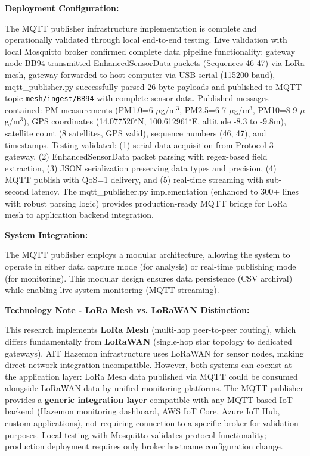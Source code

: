 \textbf{Deployment Configuration:}

The MQTT publisher infrastructure implementation is complete and operationally validated through local end-to-end testing. Live validation with local Mosquitto broker confirmed complete data pipeline functionality: gateway node BB94 transmitted EnhancedSensorData packets (Sequences 46-47) via LoRa mesh, gateway forwarded to host computer via USB serial (115200 baud), mqtt\_publisher.py successfully parsed 26-byte payloads and published to MQTT topic \texttt{mesh/ingest/BB94} with complete sensor data. Published messages contained: PM measurements (PM1.0=6 $\mu$g/m$^3$, PM2.5=6-7 $\mu$g/m$^3$, PM10=8-9 $\mu$g/m$^3$), GPS coordinates (14.077520$^\circ$N, 100.612961$^\circ$E, altitude -8.3 to -9.8m), satellite count (8 satellites, GPS valid), sequence numbers (46, 47), and timestamps. Testing validated: (1) serial data acquisition from Protocol 3 gateway, (2) EnhancedSensorData packet parsing with regex-based field extraction, (3) JSON serialization preserving data types and precision, (4) MQTT publish with QoS=1 delivery, and (5) real-time streaming with sub-second latency. The mqtt\_publisher.py implementation (enhanced to 300+ lines with robust parsing logic) provides production-ready MQTT bridge for LoRa mesh to application backend integration.

\textbf{System Integration:}

The MQTT publisher employs a modular architecture, allowing the system to operate in either data capture mode (for analysis) or real-time publishing mode (for monitoring). This modular design ensures data persistence (CSV archival) while enabling live system monitoring (MQTT streaming).

\textbf{Technology Note - LoRa Mesh vs. LoRaWAN Distinction:}

This research implements \textbf{LoRa Mesh} (multi-hop peer-to-peer routing), which differs fundamentally from \textbf{LoRaWAN} (single-hop star topology to dedicated gateways). AIT Hazemon infrastructure uses LoRaWAN for sensor nodes, making direct network integration incompatible. However, both systems can coexist at the application layer: LoRa Mesh data published via MQTT could be consumed alongside LoRaWAN data by unified monitoring platforms. The MQTT publisher provides a \textbf{generic integration layer} compatible with any MQTT-based IoT backend (Hazemon monitoring dashboard, AWS IoT Core, Azure IoT Hub, custom applications), not requiring connection to a specific broker for validation purposes. Local testing with Mosquitto validates protocol functionality; production deployment requires only broker hostname configuration change.

